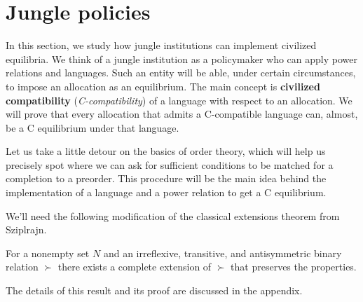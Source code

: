 
\section{Jungle policies}

In this section, we study how jungle institutions can implement civilized equilibria. We think of a jungle institution as a policymaker who can apply power relations and languages. Such an entity will be able, under certain circumstances, to impose an allocation as an equilibrium. The main concept is \textbf{civilized compatibility} (\textit{C-compatibility}) of a language with respect to an allocation. We will prove that every allocation that admits a C-compatible language can, almost, be a C equilibrium under that language.


Let us take a little detour on the basics of order theory, which will help us precisely spot where we can ask for sufficient conditions to be matched for a completion to a preorder. This procedure will be the main idea behind the implementation of a language and a power relation to get a C equilibrium.




We'll need the following modification of the classical extensions theorem from Sziplrajn.

\begin{theorem}\label{Sziplrajn}
    For a nonempty set $N$ and an irreflexive, transitive, and antisymmetric binary relation $\succ$ there exists a complete extension of $\succ$ that preserves the properties.
\end{theorem}

The details of this result and its proof are discussed in the appendix.

